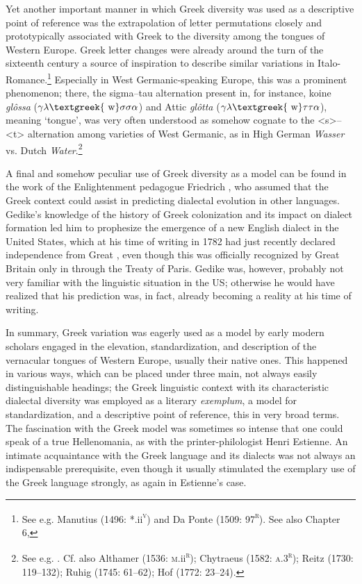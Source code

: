Yet another important manner in which Greek diversity was used as a descriptive point of reference was the extrapolation of letter permutations closely and prototypically associated with Greek to the diversity among the tongues of Western Europe. Greek letter changes were already around the turn of the sixteenth century a source of inspiration to describe similar variations in Italo-Romance.\footnote{See e.g. Manutius (1496: *.ii\textsc{\textsuperscript{v}}) and Da Ponte (1509: 97\textsc{\textsuperscript{r}}). See also Chapter 6, } Especially in West Germanic-speaking Europe, this was a prominent phenomenon; there, the sigma–tau alternation present in, for instance, koine \textit{glôssa} ($\gamma \lambda \text{\textgreek{~w}}\sigma \sigma \alpha $) and Attic \textit{glôtta} ($\gamma \lambda \text{\textgreek{~w}}\tau \tau \alpha $), meaning ‘tongue’, was very often understood as somehow cognate to the <s>–<t> alternation among varieties of West Germanic, as in High German \textit{Wasser} vs. Dutch \textit{Water}.\footnote{See e.g. \citet[21]{Mylius1612}. Cf. also Althamer (1536: \textsc{m}.ii\textsc{\textsuperscript{r}}); Chytraeus (1582: \textsc{a.3}\textsc{\textsuperscript{r}}); Reitz (1730: 119–132); Ruhig (1745: 61–62); Hof (1772: 23–24).}

A final and somehow peculiar use of Greek diversity as a model can be found in the work of the Enlightenment pedagogue Friedrich \citet[7]{Gedike1782}, who assumed that the Greek context could assist in predicting dialectal evolution in other languages. Gedike’s knowledge of the history of Greek colonization and its impact on dialect formation led him to prophesize the emergence of a new English dialect in the United States, which at his time of writing in 1782 had just recently declared independence from Great \citet{Britain1776}, even though this was officially recognized by Great Britain only in \citealt{September1783} through the Treaty of Paris. Gedike was, however, probably not very familiar with the linguistic situation in the US; otherwise he would have realized that his prediction was, in fact, already becoming a reality at his time of writing.

In summary, Greek variation was eagerly used as a model by early modern scholars engaged in the elevation, standardization, and description of the vernacular tongues of Western Europe, usually their native ones. This happened in various ways, which can be placed under three main, not always easily distinguishable headings; the Greek linguistic context with its characteristic dialectal diversity was employed as  a literary \textit{exemplum},  a model for standardization, and  a descriptive point of reference, this in very broad terms. The fascination with the Greek model was sometimes so intense that one could speak of a true Hellenomania, as with the printer-philologist Henri Estienne. An intimate acquaintance with the Greek language and its dialects was not always an indispensable prerequisite, even though it usually stimulated the exemplary use of the Greek language strongly, as again in Estienne’s case.

